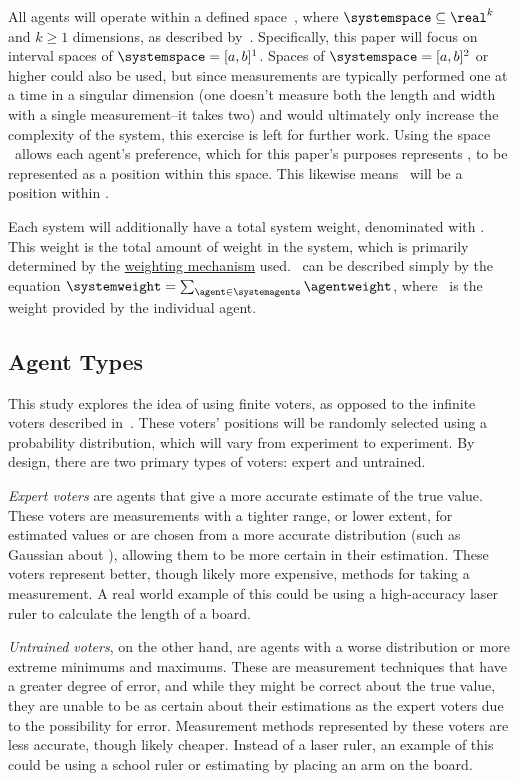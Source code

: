All agents will operate within a defined space~\systemspace, where
$\systemspace \subseteq \real^k$ and $k \geq 1$ dimensions, as described
by~\cite[para.~2.1]{Cohensius2017}.
Specifically, this paper will focus on interval spaces of
$\systemspace = [a, b]^1$.
Spaces of $\systemspace = [a, b]^2$ or higher could also be used, but since
measurements are typically performed one at a time in a singular dimension (one
doesn't measure both the length and width with a single measurement--it takes
two) and would ultimately only increase the complexity of the system, this
exercise is left for further work.
Using the space \systemspace\ allows each agent's preference, which for this
paper's purposes represents \agenttruth, to be represented as a position within
this space.
This likewise means \systemtruth\ will be a position within \systemspace.

Each system will additionally have a total system weight, denominated with
\systemweight.
This weight is the total amount of weight in the system, which is primarily
determined by the \hyperref[subsec:weighting-mechanisms]{weighting mechanism} used.
\systemweight\ can be described simply by the equation
$\systemweight = \sum_{\agent \in \systemagents} \agentweight$, where \agentweight\
is the weight provided by the individual agent.

\subsection{Agent Types}\label{subsec:agent-types}
This study explores the idea of using finite voters, as opposed to the
infinite voters described in~\cite{Cohensius2017}.
These voters' positions will be randomly selected using a probability distribution,
which will vary from experiment to experiment.
By design, there are two primary types of voters: expert and untrained.

\textit{Expert voters} are agents that give a more accurate estimate of the
true value.
These voters are measurements with a tighter range, or lower extent, for estimated
values or are chosen from a more accurate distribution (such as Gaussian about
\truth), allowing them to be more certain in their estimation.
These voters represent better, though likely more expensive, methods for
taking a measurement.
A real world example of this could be using a high-accuracy laser ruler to calculate
the length of a board.

\textit{Untrained voters}, on the other hand, are agents with a worse
distribution or more extreme minimums and maximums.
These are measurement techniques that have a greater degree of error, and while they
might be correct about the true value, they are unable to be as certain about their
estimations as the expert voters due to the possibility for error.
Measurement methods represented by these voters are less accurate, though
likely cheaper.
Instead of a laser ruler, an example of this could be using a school ruler or
estimating by placing an arm on the board.

